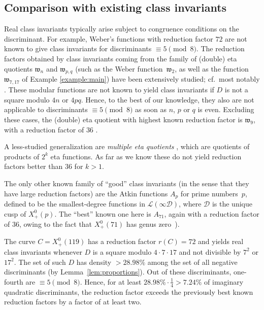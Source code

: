 \documentclass{amsart}
\newcommand{\D}{\mathcal{D}}
\newcommand{\xplus}[1]{X^0_+(#1)}
\numberwithin{equation}{section}
\theoremstyle{definition}
\begin{document}
\subsection{Comparison with existing class invariants}\label{ssec:comparison}
Real class invariants typically arise subject to congruence conditions on the discriminant.
For example, Weber's functions with reduction factor $72$ are not known to give class invariants for discriminants $\equiv 5\pmod{8}$.
The reduction factors obtained by class invariants coming from the family of (double) eta quotients $\mathfrak{w}_n$ and $\mathfrak{w}_{p,q}$
(such as the Weber function~$\mathfrak{w}_2$, as well as the function $\mathfrak{w}_{7,17}$ of Example \ref{example:main})
have been extensively studied; cf.\ most notably \cite{enge-morain2014}.
These modular functions are not known to yield
class invariants if $D$ is not a square modulo $4n$ or $4pq$.
Hence, to the best of our knowledge, they also are not applicable
to discriminants $\equiv 5\pmod{8}$ as soon as $n$, $p$ or $q$ is even.
Excluding these cases, the (double) eta quotient with highest known reduction factor is $\mathfrak{w}_9$,
with a reduction
factor of $36$ \cite[Table 7.1]{enge-morain2014}.

A less-studied generalization are \emph{multiple eta quotients} \cite{enge-schertz2013},
which are quotients of products of $2^k$ eta functions.
As far as we know these do not yield reduction factors better than $36$ for $k>1$.

The only other known family of ``good'' class invariants
(in the sense that they have large reduction factors)
are the Atkin functions $A_p$
for prime numbers~$p$,
defined to be the smallest-degree functions
in $\mathcal{L}(\infty \D)$,
where $\D$ is the unique cusp of $\xplus{p}$.
The ``best'' known one here is $A_{71}$,
again with a reduction factor of $36$,
owing to the fact
that $\xplus{71}$ has genus zero~\cite[\S3]{enge-sutherland2010}).

The curve $C=\xplus{119}$
has a reduction factor $r(C) = 72$
and yields real class invariants
whenever $D$ is a square modulo $4\cdot7\cdot 17$
and not divisible by $7^2$ or $17^2$.
The set of such $D$ has density $> 28.98\%$
among the set of all negative discriminants
(by Lemma~\ref{lem:proportions}).
Out of these discriminants, one-fourth are $\equiv 5\pmod{8}$.
Hence, for at least $28.98\%\cdot\frac{1}{4}> 7.24\%$
of imaginary quadratic discriminants,
the reduction factor
exceeds the previously best known reduction factors
by a factor of at least two.
\end{document}
